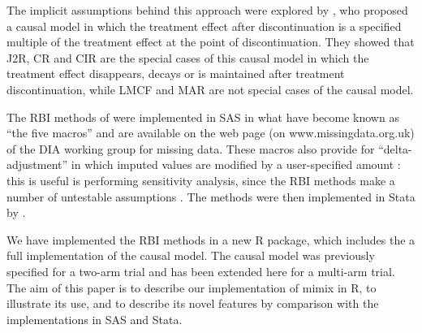 The implicit assumptions behind this approach were explored by \citet{ian:RBIcausal}, who proposed a causal model in which the treatment effect after discontinuation is a specified multiple of the treatment effect at the point of discontinuation. They showed that J2R, CR and CIR are the special cases of this causal model in which the treatment effect disappears, decays or is maintained after treatment discontinuation, while LMCF and MAR are not special cases of the causal model. 

The RBI methods of \citet{Carpenter++13} were implemented in SAS in what have become known as ``the five macros'' and are available on the web page (on www.missingdata.org.uk) of the DIA working group for missing data. These macros also provide for ``delta-adjustment'' in which imputed values are modified by a user-specified amount \citep{Ratitch++13}: this is useful is performing sensitivity analysis, since the RBI methods make a number of untestable assumptions \citep{ian:ZAMSTAR}.
The methods were then implemented in Stata by \citet{Cro++16}.

We have implemented the RBI methods in a new R package, which includes the a full implementation of the causal model. 
The causal model was previously specified for a two-arm trial and has been extended here for a multi-arm trial.
The aim of this paper is to describe our implementation of mimix in R, to illustrate its use, and to describe its novel features by comparison with the implementations in SAS and Stata.

%
%

%
%


